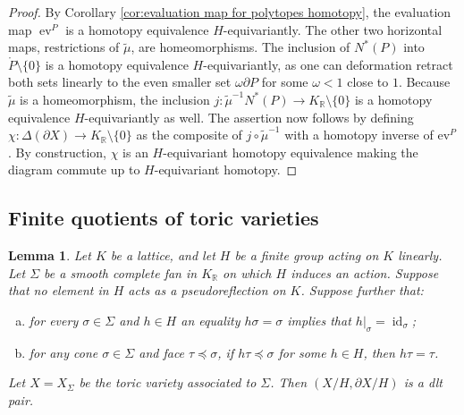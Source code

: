 \documentclass[11pt, a4paper]{amsart}
\newtheorem{lemma}[theorem]{Lemma}
\theoremstyle{definition}
\theoremstyle{myitemstyle}
\newcommand{\R}{\mathbb{R}}
\DeclareMathOperator{\id}{id}
\DeclareMathOperator{\ev}{ev}
\begin{document}
\begin{proof}
By Corollary \ref{cor:evaluation map for polytopes homotopy}, the evaluation map $\ev^P$ is a homotopy equivalence $H$-equivariantly. The other   two horizontal maps, restrictions of $\widetilde \mu$, are homeomorphisms. The inclusion of $N^*(P)$ into $\mathring P\setminus\{0\}$ is a homotopy equivalence $H$-equivariantly, as one can deformation retract both sets linearly to the even smaller set $\omega\partial P$ for some $\omega<1$ close to $1$. Because $\widetilde \mu$ is a homeomorphism, the inclusion $j\colon\widetilde{\mu}^{-1}N^*(P)\rightarrow K_{\mathbb{R}}\setminus \{0\}$ is a homotopy equivalence $H$-equivariantly as well. 
The assertion now follows by defining $\chi \colon \Delta(\partial X) \to K_{\mathbb{R}} \setminus \{0\}$ as the composite of $j\circ \tilde{\mu}^{-1}$ with a homotopy inverse of $\mathrm{ev}^P$. By construction, $\chi$ is an $H$-equivariant homotopy equivalence making the diagram commute up to $H$-equivariant homotopy. 
\end{proof}

\subsection{Finite quotients of toric varieties}

\begin{lemma}
\label{lem:dlt quotient}
Let $K$ be a lattice, and let $H$ be a finite group acting on $K$ linearly. Let $\Sigma$ be a smooth complete fan in $K_\R$ on which $H$ induces an action. Suppose that no element in $H$ acts as a pseudoreflection on $K$. Suppose further that:
\begin{enumerate}[(a)]
\item for every $\sigma\in \Sigma$ and $h\in H$ an equality $h\sigma=\sigma$ implies that $h|_\sigma=\id_\sigma$;
\item for any cone $\sigma \in \Sigma$ and face $\tau \preceq \sigma$, if $h\tau \preceq \sigma$ for some $h \in H$, then $h\tau = \tau$.
\end{enumerate}

Let $X=X_\Sigma$ be the toric variety associated to $\Sigma$. Then $(X/H, \partial X/H)$ is a dlt pair.
\end{lemma}
\end{document}
